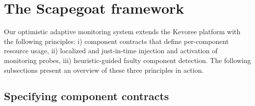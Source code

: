 \section{The Scapegoat framework\label{sec:approach}}


Our optimistic adaptive monitoring system extends the Kevoree platform with the following principles: i) component contracts that define per-component resource usage, ii) localized and just-in-time injection and activation of monitoring probes, iii) heuristic-guided faulty component detection. The following subsections present an overview of these three principles in action. 
 



\subsection{Specifying component contracts} \label{componentcontract}

